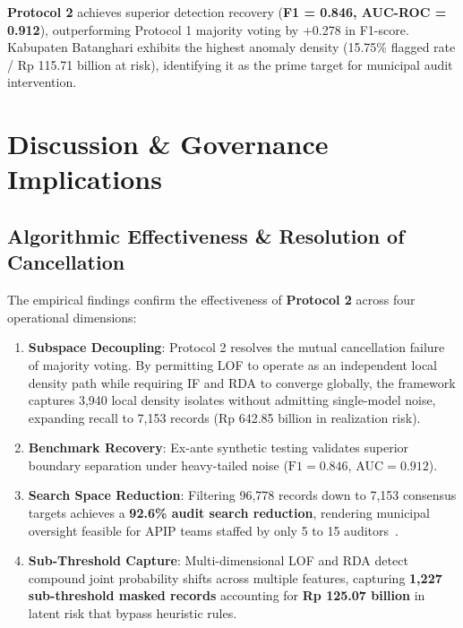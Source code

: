 \documentclass[conference]{IEEEtran}
\begin{document}
\textbf{Protocol 2} achieves superior detection recovery (\textbf{F1 = 0.846, AUC-ROC = 0.912}), outperforming Protocol 1 majority voting by +0.278 in F1-score. Kabupaten Batanghari exhibits the highest anomaly density (15.75\% flagged rate / Rp 115.71 billion at risk), identifying it as the prime target for municipal audit intervention.

\section{Discussion \& Governance Implications}

\subsection{Algorithmic Effectiveness \& Resolution of Cancellation}

The empirical findings confirm the effectiveness of \textbf{Protocol 2} across four operational dimensions:
\begin{enumerate}
    \item \textbf{Subspace Decoupling}: Protocol 2 resolves the mutual cancellation failure of majority voting. By permitting LOF to operate as an independent local density path while requiring IF and RDA to converge globally, the framework captures 3,940 local density isolates without admitting single-model noise, expanding recall to 7,153 records (Rp 642.85 billion in realization risk).
    \item \textbf{Benchmark Recovery}: Ex-ante synthetic testing validates superior boundary separation under heavy-tailed noise ($\text{F1} = 0.846$, $\text{AUC} = 0.912$).
    \item \textbf{Search Space Reduction}: Filtering 96,778 records down to 7,153 consensus targets achieves a \textbf{92.6\% audit search reduction}, rendering municipal oversight feasible for APIP teams staffed by only 5 to 15 auditors~\cite{ref12}.
    \item \textbf{Sub-Threshold Capture}: Multi-dimensional LOF and RDA detect compound joint probability shifts across multiple features, capturing \textbf{1,227 sub-threshold masked records} accounting for \textbf{Rp 125.07 billion} in latent risk that bypass heuristic rules.
\end{enumerate}
\end{document}
